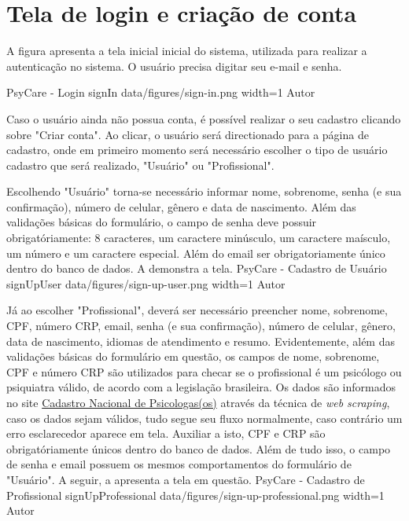\section{Tela de login e criação de conta}
\label{sec:loginCriacao}

A figura  apresenta a tela inicial inicial do sistema, utilizada para realizar a autenticação no sistema. O usuário precisa digitar seu e-mail e senha.

\image
    {PsyCare - Login}
    {signIn}
    {data/figures/sign-in.png}
    {width=1\textwidth}
    {Autor}

Caso o usuário ainda não possua conta, é possível realizar o seu cadastro clicando sobre "Criar conta". Ao clicar, o usuário será directionado para a página de cadastro, onde em primeiro momento será necessário escolher o tipo de usuário cadastro que será realizado, "Usuário" ou "Profissional". 

Escolhendo "Usuário" torna-se necessário informar nome, sobrenome, senha (e sua confirmação), número de celular, gênero e data de nascimento. Além das validações básicas do formulário, o campo de senha deve possuir obrigatóriamente: 8 caracteres, um caractere minúsculo, um caractere maísculo, um número e um caractere especial. Além do email ser obrigatoriamente único dentro do banco de dados. A  demonstra a tela.
\image
    {PsyCare - Cadastro de Usuário}
    {signUpUser}
    {data/figures/sign-up-user.png}
    {width=1\textwidth}
    {Autor}

Já ao escolher "Profissional", deverá ser necessário preencher nome, sobrenome, CPF, número CRP, email, senha (e sua confirmação), número de celular, gênero, data de nascimento, idiomas de atendimento e resumo. Evidentemente, além das validações básicas do formulário em questão, os campos de nome, sobrenome, CPF e número CRP são utilizados para checar se o profissional é um psicólogo ou psiquiatra válido, de acordo com a legislação brasileira. Os dados são informados no site \href{https://cadastro.cfp.org.br/}{Cadastro Nacional de Psicologas(os)} através da técnica de \textit{web scraping}, caso os dados sejam válidos, tudo segue seu fluxo normalmente, caso contrário um erro esclarecedor aparece em tela. Auxiliar a isto, CPF e CRP são obrigatóriamente únicos dentro do banco de dados. Além de tudo isso, o campo de senha e email possuem os mesmos comportamentos do formulário de "Usuário". A seguir, a  apresenta a tela em questão.
\image
    {PsyCare - Cadastro de Profissional}
    {signUpProfessional}
    {data/figures/sign-up-professional.png}
    {width=1\textwidth}
    {Autor}